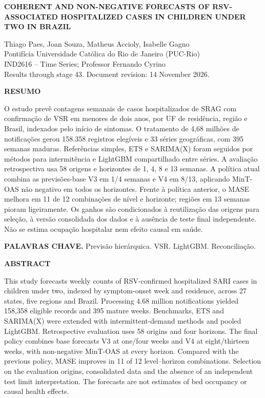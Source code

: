 \documentclass[12pt,a4paper]{article}
\begin{document}
\begin{center}
{\large\bfseries COHERENT AND NON-NEGATIVE FORECASTS OF RSV-ASSOCIATED HOSPITALIZED CASES IN CHILDREN UNDER TWO IN BRAZIL}
\vspace{0.5cm}

Thiago Paes, Joan Souza, Matheus Accioly, Isabelle Gagno\\
Pontifícia Universidade Católica do Rio de Janeiro (PUC-Rio)\\
IND2616 -- Time Series; Professor Fernando Cyrino\\
\small Results through stage 43. Document revision: 14 November 2026.
\end{center}
\noindent\textbf{RESUMO}

\noindent O estudo prevê contagens semanais de casos hospitalizados de SRAG com confirmação de VSR em menores de dois anos, por UF de residência, região e Brasil, indexados pelo início de sintomas. O tratamento de 4,68 milhões de notificações gerou 158.358 registros elegíveis e 33 séries geográficas, com 395 semanas maduras. Referências simples, ETS e SARIMA(X) foram seguidos por métodos para intermitência e LightGBM compartilhado entre séries. A avaliação retrospectiva usa 58 origens e horizontes de 1, 4, 8 e 13 semanas. A política atual combina as previsões-base V3 em 1/4 semanas e V4 em 8/13, aplicando MinT-OAS não negativo em todos os horizontes. Frente à política anterior, o MASE melhora em 11 de 12 combinações de nível e horizonte; regiões em 13 semanas pioram ligeiramente. Os ganhos são condicionados à reutilização das origens para seleção, à versão consolidada dos dados e à ausência de teste final independente. Não se estima ocupação hospitalar nem efeito causal em saúde.

\noindent\textbf{PALAVRAS CHAVE.} Previsão hierárquica. VSR. LightGBM. Reconciliação.
\vspace{0.2cm}

\noindent\textbf{ABSTRACT}

\noindent This study forecasts weekly counts of RSV-confirmed hospitalized SARI cases in children under two, indexed by symptom-onset week and residence, across 27 states, five regions and Brazil. Processing 4.68 million notifications yielded 158,358 eligible records and 395 mature weeks. Benchmarks, ETS and SARIMA(X) were extended with intermittent-demand methods and pooled LightGBM. Retrospective evaluation uses 58 origins and four horizons. The final policy combines base forecasts V3 at one/four weeks and V4 at eight/thirteen weeks, with non-negative MinT-OAS at every horizon. Compared with the previous policy, MASE improves in 11 of 12 level--horizon combinations. Selection on the evaluation origins, consolidated data and the absence of an independent test limit interpretation. The forecasts are not estimates of bed occupancy or causal health effects.
\end{document}
